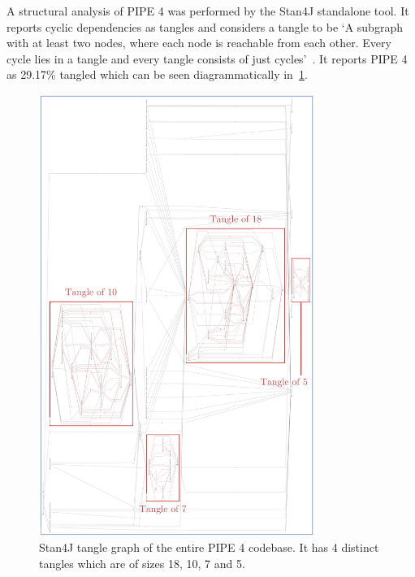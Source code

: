 

A structural analysis of PIPE 4 was performed by the Stan4J standalone tool. It reports cyclic dependencies as tangles and considers a tangle to be `A subgraph with at least two nodes, where each node is reachable from each other. Every cycle lies in a tangle and every tangle consists of just cycles'~\cite{stan_whitepaper}. It reports PIPE 4 as 29.17\% tangled which can be seen diagrammatically in~\cref{fig:tangle}.

\begin{figure}[tb]
\begin{center}
    \includegraphics[width=0.8\textwidth]{analysis/tangle_annotated.png} 
    \caption{Stan4J tangle graph of the entire PIPE 4 codebase. It has 4 distinct tangles which are of sizes 18, 10, 7 and 5.}
    \label{fig:tangle}
\end{center}
\end{figure}

% 

